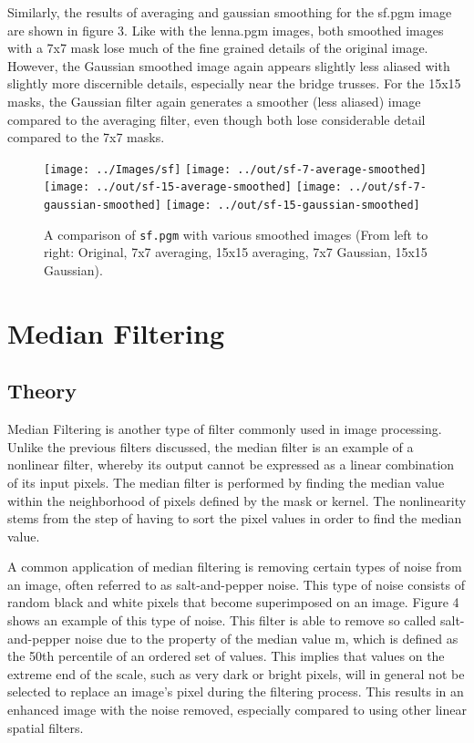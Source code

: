 \documentclass[headings=optiontoheadandtoc,listof=totoc,parskip=full]{scrartcl}
\begin{document}
Similarly, the results of averaging and gaussian smoothing for the sf.pgm image are shown in figure 3. Like with the lenna.pgm images, both smoothed images with a 7x7 mask lose much of the fine grained details of the original image. However, the Gaussian smoothed image again appears slightly less aliased with slightly more discernible details, especially near the bridge trusses. For the 15x15 masks, the Gaussian filter again generates a smoother (less aliased) image compared to the averaging filter, even though both lose considerable detail compared to the 7x7 masks.

\begin{figure}[ht]
	\centering
	\texttt{[image: ../Images/sf]}
	\texttt{[image: ../out/sf-7-average-smoothed]}
	\texttt{[image: ../out/sf-15-average-smoothed]}
	\texttt{[image: ../out/sf-7-gaussian-smoothed]}
	\texttt{[image: ../out/sf-15-gaussian-smoothed]}
	\caption{A comparison of \texttt{sf.pgm} with various smoothed images (From left to right: Original, 7x7 averaging, 15x15 averaging, 7x7 Gaussian, 15x15 Gaussian).}
	\label{fig:smoothing-result-2}
\end{figure}

\section{Median Filtering}
\label{sec:median}


\subsection{Theory}
\label{sec:median-theory}

Median Filtering is another type of filter commonly used in image processing. Unlike the previous filters discussed, the median filter is an example of a nonlinear filter, whereby its output cannot be expressed as a linear combination of its input pixels. The median filter is performed by finding the median value within the neighborhood of pixels defined by the mask or kernel. The nonlinearity stems from the step of having to sort the pixel values in order to find the median value. 

A common application of median filtering is removing certain types of noise from an image, often referred to as salt-and-pepper noise. This type of noise consists of random black and white pixels that become superimposed on an image. Figure 4 shows an example of this type of noise. This filter is able to remove so called salt-and-pepper noise due to the property of the median value m, which is defined as the 50th percentile of an ordered set of values. This implies that values on the extreme end of the scale, such as very dark or bright pixels, will in general not be selected to replace an image’s pixel during the filtering process. This results in an enhanced image with the noise removed, especially compared to using other linear spatial filters.
\end{document}
